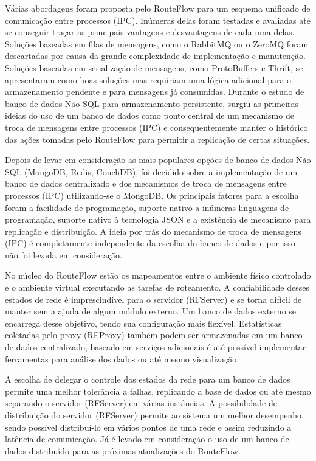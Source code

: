 Várias abordagens foram proposta pelo RouteFlow para um
esquema unificado de comunicação entre processos (IPC). 
Inúmeras delas foram testadas e avaliadas até se conseguir 
traçar as principais vantagens e desvantagens de cada uma delas.
Soluções baseadas em filas de mensagens, como o RabbitMQ
ou o ZeroMQ foram descartadas por causa da grande complexidade
de implementação e manutenção. Soluções baseadas em serialização
de mensagens, como ProtoBuffers e Thrift, se apresentaram como
boas soluções mas requiriam uma lógica adicional para o armazenamento
pendente e para mensagens já consumidas. Durante o estudo
de banco de dados Não SQL para armazenamento persistente,
surgiu as primeiras ideias do uso de um banco de dados como
ponto central de um mecanismo de troca de mensagens entre 
processos (IPC) e consequentemente manter o histórico das 
ações tomadas pelo RouteFlow para permitir a replicação de certas
situações.

Depois de levar em consideração as mais populares opções de 
banco de dados Não SQL (MongoDB, Redis, CouchDB), foi 
decidido sobre a implementação de um banco de dados centralizado
e dos mecanismos de troca de mensagens entre processos (IPC) 
utilizando-se o MongoDB. Os principais fatores para a escolha foram
a facilidade de programação, suporte nativo a inúmeras linguagens de 
programação, suporte nativo à tecnologia JSON e a existência de 
mecanismo para replicação e distribuição. A ideia por trás do
mecanismo de troca de mensagens (IPC) é completamente
independente da escolha do banco de dados e por isso não 
foi levada em consideração.

No núcleo do RouteFlow estão os mapeamentos entre o ambiente
físico controlado e o ambiente virtual executando as tarefas de
roteamento. A confiabilidade desses estados de rede é imprescindível 
para o servidor (RFServer) e se torna difícil de manter sem a ajuda de 
algum módulo externo. Um banco de dados externo se encarrega
desse objetivo, tendo sua configuração mais flexível. Estatísticas
coletadas pelo proxy (RFProxy) também podem ser armazenadas em 
um banco de dados centralizado, baseado em serviços adicionais
é até possível implementar ferramentas para análise dos dados 
ou até mesmo visualização.

A escolha de delegar o controle dos estados da rede para um
banco de dados permite uma melhor tolerância a falhas, replicando
a base de dados ou até mesmo separando o servidor (RFServer) em várias
instâncias. A possibilidade de distribuição do servidor (RFServer) permite
ao sistema um melhor desempenho, sendo possível distribuí-lo
em vários pontos de uma rede e assim reduzindo a latência de
comunicação. Já é levado em consideração o uso de um banco de
dados distribuído para as próximas atualizações do RouteFlow.

